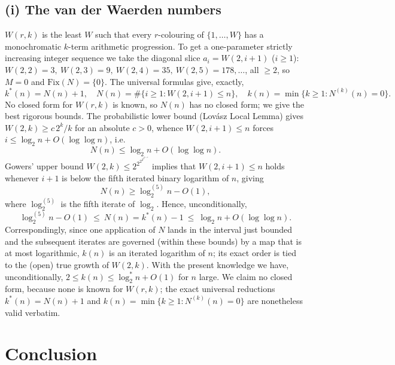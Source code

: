 \documentclass[12pt]{article}
\theoremstyle{definition}
\begin{document}
\subsection{(i) The van der Waerden numbers}
$W(r,k)$ is the least $W$ such that every $r$-colouring of $\{1,\dots,W\}$ has a
monochromatic $k$-term arithmetic progression. To get a one-parameter strictly
increasing integer sequence we take the diagonal slice $a_i=W(2,i+1)$ ($i\ge1$):
$W(2,2)=3,\ W(2,3)=9,\ W(2,4)=35,\ W(2,5)=178,\dots$, all $\ge2$, so $M=0$ and
$\mathrm{Fix}(N)=\{0\}$. The universal formulas give, exactly,
\[
  k^*(n)=N(n)+1,\quad N(n)=\#\{i\ge1:W(2,i+1)\le n\},\quad
  k(n)=\min\{k\ge1:N^{(k)}(n)=0\}.
\]
No closed form for $W(r,k)$ is known, so $N(n)$ has no closed form; we give the best
rigorous bounds. The probabilistic lower bound (Lovász Local Lemma) gives
$W(2,k)\ge c\,2^{k}/k$ for an absolute $c>0$, whence $W(2,i+1)\le n$ forces
$i\le\log_2 n+O(\log\log n)$, i.e.
\[
  N(n)\le\log_2 n+O(\log\log n).
\]
Gowers' upper bound $W(2,k)\le 2^{2^{2^{2^{2^{\,k+9}}}}}$ implies that $W(2,i+1)\le n$
holds whenever $i+1$ is below the fifth iterated binary logarithm of $n$, giving
\[
  N(n)\ge\log^{(5)}_2 n-O(1),
\]
where $\log^{(5)}_2$ is the fifth iterate of $\log_2$. Hence, unconditionally,
\[
  \log^{(5)}_2 n-O(1)\ \le\ N(n)=k^*(n)-1\ \le\ \log_2 n+O(\log\log n).
\]
Correspondingly, since one application of $N$ lands in the interval just bounded and
the subsequent iterates are governed (within these bounds) by a map that is at most
logarithmic, $k(n)$ is an iterated logarithm of $n$; its exact order is tied to the
(open) true growth of $W(2,k)$. With the present knowledge we have, unconditionally,
$2\le k(n)\le \log^*_2 n+O(1)$ for $n$ large. We claim no closed form, because none is
known for $W(r,k)$; the exact universal reductions $k^*(n)=N(n)+1$ and
$k(n)=\min\{k\ge1:N^{(k)}(n)=0\}$ are nonetheless valid verbatim.

\section{Conclusion}
\end{document}
